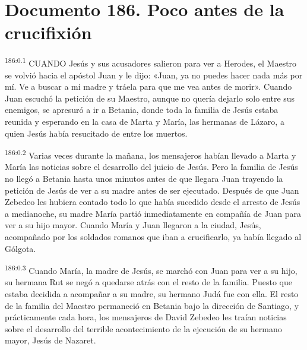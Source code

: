 \chapter{Documento 186. Poco antes de la crucifixión}
\par 
\textsuperscript{186:0.1} CUANDO Jesús y sus acusadores salieron para ver a Herodes, el Maestro se volvió hacia el apóstol Juan y le dijo: «Juan, ya no puedes hacer nada más por mí. Ve a buscar a mi madre y tráela para que me vea antes de morir». Cuando Juan escuchó la petición de su Maestro, aunque no quería dejarlo solo entre sus enemigos, se apresuró a ir a Betania, donde toda la familia de Jesús estaba reunida y esperando en la casa de Marta y María, las hermanas de Lázaro, a quien Jesús había resucitado de entre los muertos.

\par 
\textsuperscript{186:0.2} Varias veces durante la mañana, los mensajeros habían llevado a Marta y María las noticias sobre el desarrollo del juicio de Jesús. Pero la familia de Jesús no llegó a Betania hasta unos minutos antes de que llegara Juan trayendo la petición de Jesús de ver a su madre antes de ser ejecutado. Después de que Juan Zebedeo les hubiera contado todo lo que había sucedido desde el arresto de Jesús a medianoche, su madre María partió inmediatamente en compañía de Juan para ver a su hijo mayor. Cuando María y Juan llegaron a la ciudad, Jesús, acompañado por los soldados romanos que iban a crucificarlo, ya había llegado al Gólgota.

\par 
\textsuperscript{186:0.3} Cuando María, la madre de Jesús, se marchó con Juan para ver a su hijo, su hermana Rut se negó a quedarse atrás con el resto de la familia. Puesto que estaba decidida a acompañar a su madre, su hermano Judá fue con ella. El resto de la familia del Maestro permaneció en Betania bajo la dirección de Santiago, y prácticamente cada hora, los mensajeros de David Zebedeo les traían noticias sobre el desarrollo del terrible acontecimiento de la ejecución de su hermano mayor, Jesús de Nazaret.

